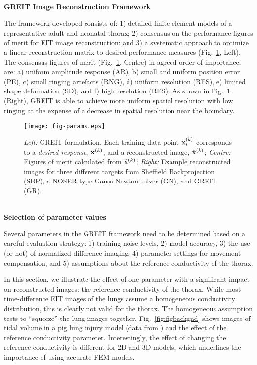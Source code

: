 \documentclass[12pt]{article}
\newcommand{\mysection}[1]{
~\\ \noindent
{\bf \normalsize #1}
\vspace{1mm}
}
\begin{document}
\vspace{-3mm}
\mysection{GREIT Image Reconstruction Framework}

The framework developed\cite{GREIT09} consists of: 1)
detailed finite element models of a representative adult
and neonatal thorax; 2) consensus on the performance
figures of merit for EIT image reconstruction; and 3) a
systematic approach to optimize a linear reconstruction
matrix to desired performance measures (Fig.\ \ref{fig:figparams}, Left).
The consensus figures of merit (Fig.\ \ref{fig:figparams}, Centre)
 in agreed order of importance,
are: a) uniform amplitude response (AR), b) small and
uniform position error (PE), c) small ringing artefacts (RNG),
d) uniform resolution (RES), e) limited shape deformation (SD),
and f) high resolution (RES). 
As shown in Fig.\ \ref{fig:figparams} (Right), GREIT is able to 
achieve more uniform spatial resolution with low ringing at the
expense of a decrease in spatial resolution near the boundary.
\vspace{-4mm}
\begin{figure}[htp]
\centering
\texttt{[image: fig-params.eps]}
\vspace{-6mm}
\caption{%
\small
{\em Left:} GREIT formulation. Each training data point
    ${\bf x}_t^{(k)}$ corresponds to a {\em desired response},
$\tilde{\bf x}^{(k)}$, and a reconstructed image,
  $\hat{\bf x}^{(k)}$;
{\em Centre:} Figures of merit calculated from $\hat{\bf x}^{(k)}$;
{\em Right:} Example reconstructed images for three different
targets from
Sheffield Backprojection (SBP), a NOSER type Gauss-Newton solver (GN),
and GREIT (GR).
}
\label{fig:figparams}
\end{figure}

\mysection{Selection of parameter values}

Several parameters in the GREIT framework need to be
determined based on a careful evaluation strategy:
1) training noise levels,
2) model accuracy,
3) the use (or not) of normalized difference imaging,
4) parameter settings for movement compensation, and
5) assumptions about the reference conductivity of the thorax.

In this section, we illustrate the effect of one parameter
with a significant impact on reconstructed images: the
reference conductivity of the thorax.
While most time-difference EIT
images of the lungs assume a homogeneous conductivity 
distribution, this is clearly not valid for the thorax. 
The homogeneous assumption tests to ``squeeze'' the lung
images together. Fig.\ \ref{fig:figbackgnd} shows images
of tidal volume in a pig lung injury model (data from 
\cite{frerichs03}) and the effect of the reference
conductivity parameter. Interestingly, the effect of changing
the reference conductivity is different for 2D and 
3D models, which underlines the importance of using accurate
FEM models.
\end{document}
